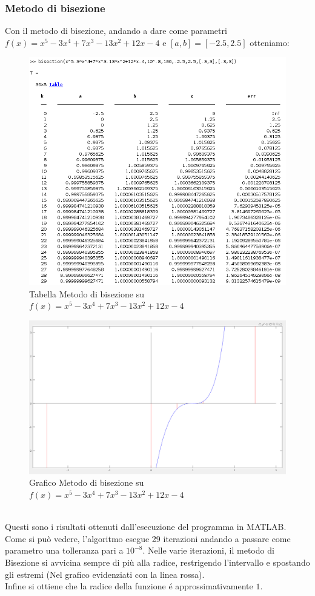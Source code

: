 \documentclass[12pt, letterpaper]{article}
\begin{document}
\subsubsection{Metodo di bisezione}
Con il metodo di bisezione, andando a dare come parametri $f(x)=x^5-3x^4+7x^3-13x^2+12x-4$ e $[a,b]=[-2.5,2.5]$ otteniamo:
\begin{figure}[ht!]
    \includegraphics[scale=0.58]{TabellaMultiRadixBisezione.png}
    \caption{Tabella Metodo di bisezione su $f(x)=x^5-3x^4+7x^3-13x^2+12x-4$}
\end{figure}
\begin{figure}[ht!]
    \includegraphics[scale=0.4]{MultiRadixBisezione1.png}
    \caption{Grafico Metodo di bisezione su $f(x)=x^5-3x^4+7x^3-13x^2+12x-4$}
\end{figure} \\
Questi sono i risultati ottenuti dall'esecuzione del programma in MATLAB.\\ Come si può vedere, l'algoritmo esegue 29 iterazioni andando a passare come parametro una tolleranza pari a $10^{-8}$.
Nelle varie iterazioni, il metodo di Bisezione si avvicina sempre di più alla radice, restrigendo l'intervallo e spostando gli estremi (Nel grafico evidenziati con la linea rossa). \\
Infine si ottiene che la radice della funzione \'e approssimativamente $1$.
\end{document}
